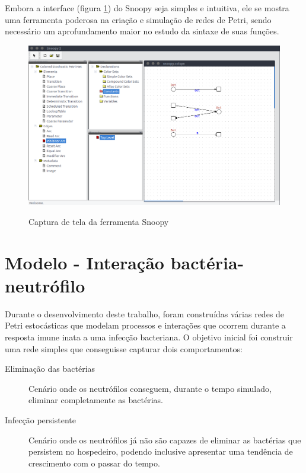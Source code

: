 \documentclass[a4paper,10pt]{article}
\begin{document}
		
		Embora a interface (figura \ref{fig:snoopy}) do Snoopy seja simples e intuitiva, ele se mostra uma ferramenta poderosa na criação e simulação de redes de Petri, sendo
		necessário um aprofundamento maior no estudo da sintaxe de suas funções.
		
		\begin{figure}
			\begin{center}
				\label{fig:snoopy}
				\includegraphics[scale=0.3]{imagens/snoopy.png}
				\caption{Captura de tela da ferramenta Snoopy}
			\end{center}
		\end{figure}

	\section{Modelo - Interação bactéria-neutrófilo}\label{Bacteria-NeutrophilModel}
	
		Durante o desenvolvimento deste trabalho, foram construídas várias redes de Petri
		estocásticas que modelam processos e interações que ocorrem durante a resposta imune inata a uma
		infecção bacteriana. O objetivo inicial foi construir uma rede simples que conseguisse capturar dois
		comportamentos: 
		
		\begin{description}
			\item[Eliminação das bactérias] Cenário onde os neutrófilos conseguem, durante o tempo simulado, 
			eliminar completamente as bactérias.
			\item[Infecção persistente] Cenário onde os neutrófilos já não são capazes de eliminar as bactérias 
			que persistem no hospedeiro, podendo inclusive apresentar uma tendência de crescimento com o passar do tempo.
		\end{description}
		
\end{document}
